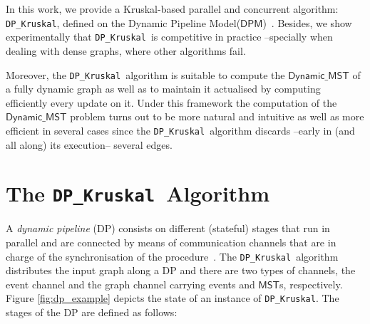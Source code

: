 \documentclass[runningheads,UKenglish]{llncs}
\newcounter{instance}
\newcommand{\msts}{$\mathsf{MST}$s}
\newcommand{\dynmst}{\mathsf{Dynamic\_MST}}
\newcommand{\dpm}{$\mathsf{DPM}$}
\newcommand{\DPmst}{\texttt{DP\_{Kruskal}}}
\begin{document}
In this work, we provide a Kruskal-based parallel 
and concurrent algorithm: \DPmst, defined on the 
Dynamic Pipeline Model(\dpm)~\cite{Pasarella2024,DP2019,pasarella2017comparing}. Besides, we show experimentally that \DPmst\ is 
competitive in practice --specially when dealing with dense graphs, 
where other algorithms fail.

Moreover, the \DPmst\ algorithm is suitable to compute the $\dynmst$ of a fully dynamic graph as well as to maintain it actualised by computing efficiently every update on it.
Under this framework the computation of the  $\dynmst$ problem 
turns out to be more natural and intuitive
as well as  more efficient in several cases since the \DPmst\ algorithm discards --early in (and all along) its execution-- several edges.

\vspace{-1em}

\section{The \DPmst\ Algorithm}
\label{sec:DPMST}

\vspace{-0.5em}

A \emph{dynamic pipeline} (DP) consists on different (stateful) stages that run in parallel and are connected  
by means of communication channels that are in charge of the synchronisation of the procedure~\cite{Pasarella2024}. 
The \DPmst\ algorithm distributes the input graph along a DP and there are two types of channels, the event channel and the graph
channel carrying events and \msts, respectively. Figure \ref{fig:dp_example} depicts the state of an instance
of \DPmst. The stages of the DP are defined as follows:
\end{document}
